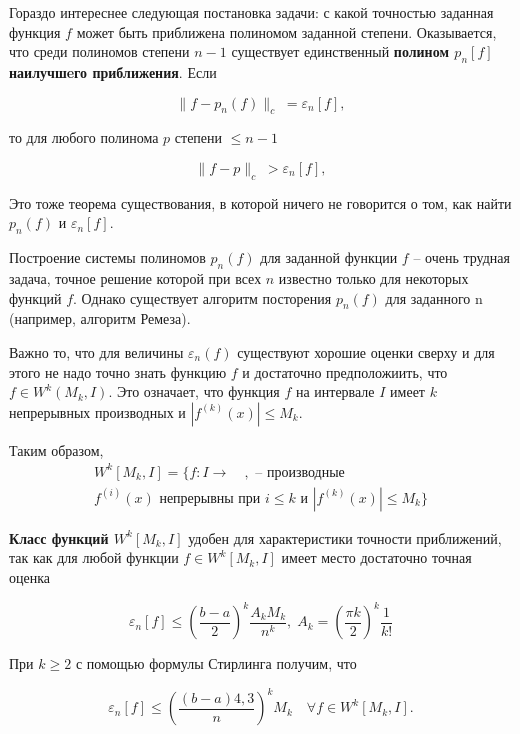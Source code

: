 Гораздо интереснее следующая постановка задачи: с какой точностью заданная функция $f$ может быть приближена полиномом заданной степени. 
Оказывается, что среди полиномов степени $n - 1$ существует единственный \textbf{полином $p_n[f]$ наилучшeго приближения}. Если

\begin{equation}\label{eq:best_polynom}
\parallel f - p_n(f) \parallel_c \; = \varepsilon_n[f],
\end{equation}

то для любого полинома $p$ степени $\leq n - 1$

\begin{equation}
\parallel f - p \parallel_c \; > \varepsilon_n[f],
\end{equation}

Это тоже теорема существования, в которой ничего не говорится о том, как найти $p_n(f)$ и  $\varepsilon_n[f]$.

Построение системы полиномов $p_n(f)$ для заданной функции $f$ -- очень трудная задача, точное решение которой при всех $n$ известно только для некоторых функций $f$. 
Однако существует алгоритм посторения $p_n(f)$ для заданного n (например, алгоритм Ремеза).

Важно то, что для величины $\varepsilon_n(f)$ существуют хорошие оценки сверху и для этого не надо точно знать функцию $f$ и достаточно предположиить, что $f \in W^k(M_k, I)$. Это означает, что функция $f$ на интервале $I$ имеет $k$ непрерывных производных и $|f^{(k)}(x)|\leq M_k$. 

Таким образом,
\begin{eqnarray}
W^k[M_k, I] = \{f: I \rightarrow \quad, \text{ -- производные} \nonumber \\
f^{(i)}(x) \text{ непрерывны при $i \leq k$ и } |f^{(k)}(x)| \leq M_k \}
\end{eqnarray}


\textbf{Класс функций $W^k[M_k, I]$} удобен для характеристики точности приближений, так как для любой функции $f \in W^k[M_k, I]$ имеет место достаточно точная оценка

\begin{equation}
\varepsilon_n[f] \leq \left(\frac{b-a}{2}\right)^k \frac{A_k M_k}{n^k},\; A_k = \left(\frac{\pi k}{2}\right) ^k \frac{1}{k!}
\end{equation}

При $k \geq 2$ с помощью формулы Стирлинга получим, что 

\begin{equation}
\varepsilon_n[f] \leq \left(\frac{(b-a)4,3}{n}\right)^k M_k \quad \forall f \in W^k[M_k, I].
\end{equation}

